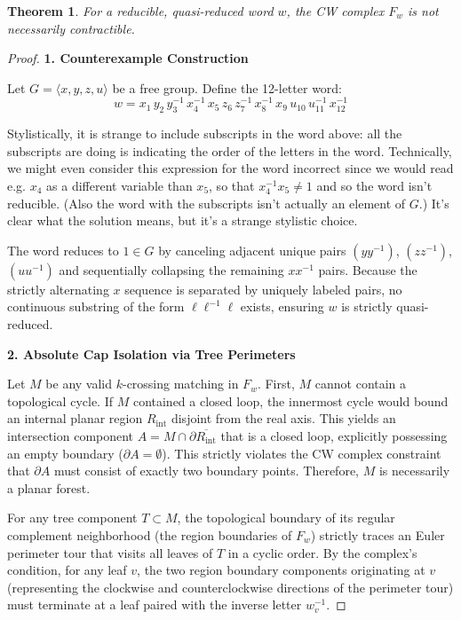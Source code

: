 \documentclass[12pt]{article}
\newtheorem{theorem}{Theorem}
\newcommand{\review}[1]{\begin{reviewbox}#1\end{reviewbox}}
\begin{document}
\begin{theorem}
For a reducible, quasi-reduced word $w$, the CW complex $F_w$ is not necessarily contractible.
\end{theorem}

\begin{proof}
\textbf{1. Counterexample Construction}

Let $G = \langle x, y, z, u \rangle$ be a free group. Define the 12-letter word:
\[
w = x_1\, y_2\, y_3^{-1}\, x_4^{-1}\, x_5\, z_6\, z_7^{-1}\, x_8^{-1}\, x_9\, u_{10}\, u_{11}^{-1}\, x_{12}^{-1}
\]
\review{Stylistically, it is strange to include subscripts in the word above: all the subscripts are doing is indicating the order of the letters in the word. Technically, we might even consider this expression for the word incorrect since we would read e.g. $x_4$ as a different variable than $x_5$, so that $x_4^{-1}x_5 \neq 1$ and so the word isn't reducible. (Also the word with the subscripts isn't actually an element of $G$.) It's clear what the solution means, but it's a strange stylistic choice.}
The word reduces to $1 \in G$ by canceling adjacent unique pairs $(y y^{-1})$, $(z z^{-1})$, $(u u^{-1})$ and sequentially collapsing the remaining $x x^{-1}$ pairs. Because the strictly alternating $x$ sequence is separated by uniquely labeled pairs, no continuous substring of the form $\ell \ell^{-1} \ell$ exists, ensuring $w$ is strictly quasi-reduced.

\vspace{1em}
\noindent\textbf{2. Absolute Cap Isolation via Tree Perimeters}

Let $M$ be any valid $k$-crossing matching in $F_w$. First, $M$ cannot contain a topological cycle. If $M$ contained a closed loop, the innermost cycle would bound an internal planar region $R_{\text{int}}$ disjoint from the real axis. This yields an intersection component $A = M \cap \partial \overline{R_{\text{int}}}$ that is a closed loop, explicitly possessing an empty boundary ($\partial A = \emptyset$). This strictly violates the CW complex constraint that $\partial A$ must consist of exactly two boundary points. Therefore, $M$ is necessarily a planar forest.

For any tree component $T \subset M$, the topological boundary of its regular complement neighborhood (the region boundaries of $F_w$) strictly traces an Euler perimeter tour that visits all leaves of $T$ in a cyclic order. By the complex's condition, for any leaf $v$, the two region boundary components originating at $v$ (representing the clockwise and counterclockwise directions of the perimeter tour) must terminate at a leaf paired with the inverse letter $w_v^{-1}$.


\end{proof}
\end{document}
